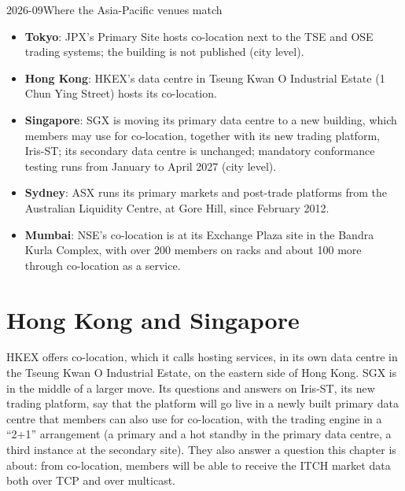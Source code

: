 \begin{dated}{2026-09}{Where the Asia-Pacific venues match}\label{dat:nw:the-asia-pacific-map:sites}
\begin{itemize}
\item \textbf{Tokyo}: JPX's Primary Site hosts co-location next to the TSE and OSE trading systems; the building is not published (city level).
\item \textbf{Hong Kong}: HKEX's data centre in Tseung Kwan O Industrial Estate (1 Chun Ying Street) hosts its co-location.
\item \textbf{Singapore}: SGX is moving its primary data centre to a new building, which members may use for co-location, together with its new
  trading platform, Iris-ST; its secondary data centre is unchanged; mandatory conformance testing runs from January to April 2027 (city level).
\item \textbf{Sydney}: ASX runs its primary markets and post-trade platforms from the Australian Liquidity Centre, at Gore Hill, since
  February 2012.
\item \textbf{Mumbai}: NSE's co-location is at its Exchange Plaza site in the Bandra Kurla Complex, with over 200 members on racks and about 100
  more through co-location as a service.
\end{itemize}
\end{dated}

\section{Hong Kong and Singapore}

HKEX offers co-location, which it calls hosting services, in its own data centre in the Tseung Kwan O Industrial Estate, on the eastern
side of Hong Kong. SGX is in the middle of a larger move. Its questions and answers on Iris-ST, its new trading platform, say that the
platform will go live in a newly built primary data centre that members can also use for co-location, with the trading engine in a ``2+1''
arrangement (a primary and a hot standby in the primary data centre, a third instance at the secondary site). They also answer a question
this chapter is about: from co-location, members will be able to receive the ITCH market data both over TCP and over multicast.

